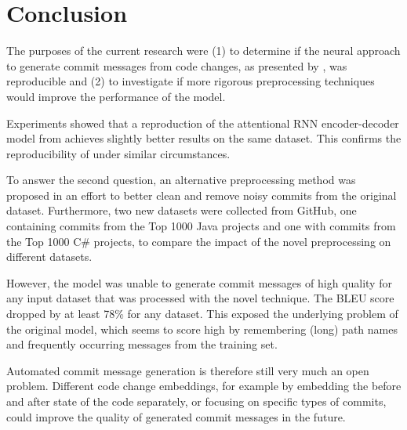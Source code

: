 \section{Conclusion}\label{sec:conclusion}
The purposes of the current research were (1) to determine if the neural approach to generate commit messages from code changes, as presented by \citet{jiang_automatically_2017}, was reproducible and (2) to investigate if more rigorous preprocessing techniques would improve the performance of the model.

Experiments showed that a reproduction of the attentional RNN encoder-decoder model from \citet{jiang_automatically_2017} achieves slightly better results on the same dataset. This confirms the reproducibility of \cite{jiang_automatically_2017} under similar circumstances.

To answer the second question, an alternative preprocessing method was proposed in an effort to better clean and remove noisy commits from the original dataset. Furthermore, two new datasets were collected from GitHub, one containing commits from the Top 1000 Java projects and one with commits from the Top 1000 C\# projects, to compare the impact of the novel preprocessing on different datasets.

However, the model was unable to generate commit messages of high quality for any input dataset that was processed with the novel technique. The BLEU score dropped by at least 78\% for any dataset. This exposed the underlying problem of the original model, which seems to score high by remembering (long) path names and frequently occurring messages from the training set.

Automated commit message generation is therefore still very much an open problem. Different code change embeddings, for example by embedding the before and after state of the code separately, or focusing on specific types of commits, could improve the quality of generated commit messages in the future.





